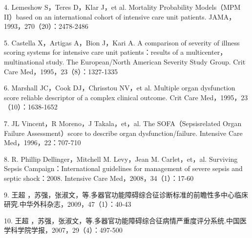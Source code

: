 4. Lemeshow S，Teres D，Klar J，et al. Mortality Probability Models（MPM
II）based on an international cohort of intensive care unit patients.
JAMA，1993，270（20）：2478-2486

5. Castella X，Artigas A，Bion J，Kari A. A comparison of severity of
illness scoring systems for intensive care unit patients：results of a
multicenter，multinational study. The European/North American Severity
Study Group. Crit Care Med，1995，23（8）：1327-1335

6. Marshall JC，Cook DJ，Chrisstou NV，et al. Multiple organ dysfunction
score reliable descriptor of a complex clinical outcome. Crit Care
Med，1995，23（10）：1638-1652

7. JL Vincent，R Moreno，J Takala，et，al. The SOFA（Sepsisrelated Organ
Failure Assessment）score to describe organ dysfunction/failure.
Intensive Care Med，1996，22：707-710

8. R. Phillip Dellinger，Mitchell M. Levy，Jean M. Carlet，et，al.
Surviving Sepsis Campaign：International guidelines for management of
severe sepsis and septic shock：2008. Intensive Care
Med，2008，34（1）：17-60

9. 王超
，苏强，张淑文，等.多器官功能障碍综合征诊断标准的前瞻性多中心临床研究.中华外科杂志，2009，47（1）：40-43

10. 王超
，苏强，张淑文，等.多器官功能障碍综合征病情严重度评分系统.中国医学科学院学报，2007，29（4）：497-500

\protect\hypertarget{text00403.html}{}{}

